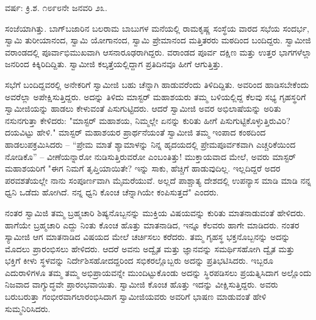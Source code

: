 \begin{center}
ವರ್ಷ: ಕ್ರಿ.ಶ. ೧೮೯೮ನೇ ಜನವರಿ ೨೩.
\end{center}

ಸಂಜೆಯಾಗಿತ್ತು. ಬಾಗ್‌ಬಜಾರಿನ ಬಲರಾಮ ಬಾಬುಗಳ ಮನೆಯಲ್ಲಿ ರಾಮಕೃಷ್ಣ ಸಂಸ್ಥೆಯ ವಾರದ ಸಭೆಯ ಸಂದರ್ಭ, ಸ್ವಾಮಿ ತುರೀಯಾನಂದ, ಸ್ವಾಮಿ ಯೋಗಾನಂದ, ಸ್ವಾಮಿ ಪ್ರೇಮಾನಂದ ಮತ್ತಿತರರು ಮಠದಿಂದ ಬಂದಿದ್ದರು. ಸ್ವಾಮೀಜಿ ವರಾಂಡದಲ್ಲಿ ಪೂರ್ವಾಭಿಮುಖವಾಗಿ ಆಸನಾರೂಢರಾಗಿದ್ದರು. ವರಾಂಡದ ಪೂರ್ವ ದಕ್ಷಿಣ ಮತ್ತು ಉತ್ತರ ಭಾಗಗಳೆಲ್ಲಾ ಜನರಿಂದ ಕಿಕ್ಕಿರಿದಿದ್ದಿತು. ಸ್ವಾಮೀಜಿ ಕಲ್ಕತ್ತೆಯಲ್ಲಿದ್ದಾಗ ಪ್ರತಿದಿನವೂ ಹೀಗೆ ಆಗುತ್ತಿತ್ತು.

ಸಭೆಗೆ ಬಂದಿದ್ದವರಲ್ಲಿ ಅನೇಕರಿಗೆ ಸ್ವಾಮೀಜಿ ಬಹು ಚೆನ್ನಾಗಿ ಹಾಡುವರೆಂದು ತಿಳಿದಿದ್ದಿತು. ಅವರಿಂದ ಹಾಡಿಸಬೇಕೆಂದು ಅವರೆಲ್ಲಾ ಅಪೇಕ್ಷಿಸುತ್ತಿದ್ದರು. ಅದನ್ನು ತಿಳಿದು ಮಾಸ್ಟರ್ ಮಹಾಶಯರು ತಮ್ಮ ಬಳಿಯಲ್ಲಿದ್ದ ಕೆಲವು ಸಭ್ಯ ಗೃಹಸ್ಥರಿಗೆ ಸ್ವಾಮೀಜಿಯನ್ನು ಹಾಡಲು ಕೇಳುವಂತೆ ಪಿಸುಗುಟ್ಟಿದರು. ಆದರೆ ಸ್ವಾಮೀಜಿ ಅವರ ಅಭಿಲಾಷೆಯನ್ನು ಅರಿತು ನಸುನಗುತ್ತಾ ಕೇಳಿದರು: "ಮಾಸ್ಟರ್ ಮಹಾಶಯ, ನಿಮ್ಮಲ್ಲೇ ಏನನ್ನು ಕುರಿತು ಹೀಗೆ ಪಿಸುಗುಟ್ಟಿಕೊಳ್ಳುತ್ತಿರುವಿರಿ? ದಯವಿಟ್ಟು ಹೇಳಿ." ಮಾಸ್ಟರ್ ಮಹಾಶಯರ ಪ್ರಾರ್ಥನೆಯಂತೆ ಸ್ವಾಮೀಜಿ ತಮ್ಮ ಇಂಪಾದ ಕಂಠದಿಂದ ಹಾಡಲುಪಕ್ರಮಿಸಿದರು – “ಪ್ರೇಮ ಮಾತೆ ಶ್ಯಾಮಾಳನ್ನು ನಿನ್ನ ಹೃದಯದಲ್ಲಿ ಪ್ರೇಮಪೂರ್ವಕವಾಗಿ ಎಚ್ಚರಿಕೆಯಿಂದ ನೋಡಿಕೊ” – ವೀಣೆಯನ್ನಾರೋ ನುಡಿಸುತ್ತಿರುವರೋ ಎಂಬಂತಿತ್ತು! ಮುಕ್ತಾಯವಾದ ಮೇಲೆ, ಅವರು ಮಾಸ್ಟರ್ ಮಹಾಶಯರಿಗೆ "ಈಗ ನಿಮಗೆ ತೃಪ್ತಿಯಾಯಿತೇ? ಇನ್ನು ಸಾಕು, ಹೆಚ್ಚಿಗೆ ಹಾಡುವುದಿಲ್ಲ. ಇಲ್ಲದಿದ್ದರೆ ಅದರ ಪರವಶತೆಯಲ್ಲೇ ನಾನು ಸಂಪೂರ್ಣವಾಗಿ ಮೈಮರೆಯುವೆ. ಅಲ್ಲದೆ ಪಾಶ್ಚಾತ್ಯ ದೇಶದಲ್ಲಿ ಉಪನ್ಯಾಸ ಮಾಡಿ ಮಾಡಿ ನನ್ನ ಧ್ವನಿ ಒಡೆದು ಹೋಗಿದೆ. ನನ್ನ ಧ್ವನಿ ಕೊಂಚ ಚೆನ್ನಾಗಿಯೇ ಕಂಪಿಸುತ್ತದೆ" ಎಂದರು.

ನಂತರ ಸ್ವಾಮಿಜಿ ತಮ್ಮ ಬ್ರಹ್ಮಚಾರಿ ಶಿಷ್ಯನೊಬ್ಬನನ್ನು ಮುಕ್ತಿಯ ವಿಷಯವನ್ನು ಕುರಿತು ಮಾತನಾಡುವಂತೆ ಹೇಳಿದರು. ಹಾಗೆಯೇ ಬ್ರಹ್ಮಚಾರಿ ಎದ್ದು ನಿಂತು ಕೊಂಚ ಹೊತ್ತು ಮಾತನಾಡಿದ, ಇನ್ನೂ ಕೆಲವರು ಹಾಗೇ ಮಾಡಿದರು. ನಂತರ ಸ್ಯಾಮೀಜಿ ಆಗ ಮಾತನಾಡಿದ ವಿಷಯದ ಮೇಲೆ ಚರ್ಚಿಸಲು ಕರೆದರು. ತಮ್ಮ ಗೃಹಸ್ಥ ಭಕ್ತನೊಬ್ಬನನ್ನು ಅದನ್ನು ಮೊದಲು ಪ್ರಾರಂಭಿಸಲು ಹೇಳಿದರು. ಆದರೆ ಅವನು ಅದ್ವೈತ ಮತ್ತು ಜ್ಞಾನವನ್ನು ಸಮರ್ಥಿಸಹೋಗಿ ದ್ವೈತ ಮತ್ತು ಭಕ್ತಿಗೆ ಕೀಳು ಸ್ಥಳವನ್ನು ನಿರ್ದೇಶಿಸಹೋದದ್ದರಿಂದ ಸಭಿಕರಲ್ಲೊಬ್ಬರು ಅದನ್ನು ಪ್ರತಿಭಟಿಸಿದರು. ಇಬ್ಬರೂ ಎದುರಾಳಿಗಳೂ ತಮ್ಮ ತಮ್ಮ ಅಭಿಪ್ರಾಯವನ್ನೇ ಮುಂದಿಟ್ಟುಕೊಂಡು ಅದನ್ನು ಸ್ಥಿರಪಡಿಸಲು ಪ್ರಯತ್ನಿಸಿದಾಗ ಅಲ್ಲೊಂದು ನಿಜವಾದ ವಾಗ್ಯುದ್ಧವೇ ಪ್ರಾರಂಭವಾಯಿತು. ಸ್ವಾಮೀಜಿ ಕೊಂಚ ಹೊತ್ತು ಇದನ್ನು ವೀಕ್ಷಿಸುತ್ತಿದ್ದರು. ಅವರು ಬರುಬರುತ್ತಾ ಗಂಭೀರವಾಗಲಾರಂಭಿಸಿದಾಗ ಸ್ವಾಮೀಜಿಯವರು ಅವರಿಗೆ ಭಾಷಣ ಮಾಡುವಂತೆ ಹೇಳಿ ಸುಮ್ಮನಿರಿಸಿದರು.

